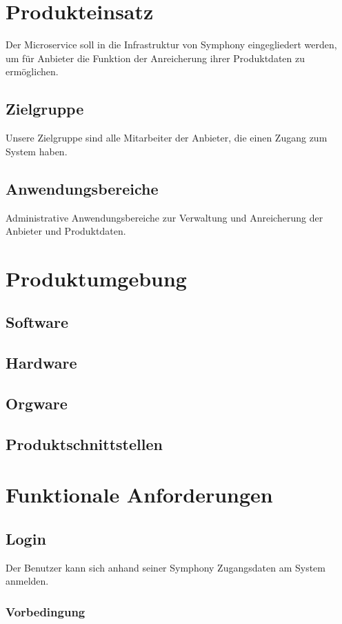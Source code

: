 \documentclass[a4paper,12pt]{article}
\begin{document}
\section{Produkteinsatz}
Der Microservice soll in die Infrastruktur von Symphony eingegliedert werden, um für Anbieter die Funktion der Anreicherung ihrer Produktdaten zu ermöglichen.

\subsection{Zielgruppe}
Unsere Zielgruppe sind alle Mitarbeiter der Anbieter, die einen Zugang zum System haben.

\subsection{Anwendungsbereiche}
Administrative Anwendungsbereiche zur Verwaltung und Anreicherung der Anbieter und Produktdaten.

\section{Produktumgebung}
\subsection{Software}
\subsection{Hardware}
\subsection{Orgware}
\subsection{Produktschnittstellen}



\section{Funktionale Anforderungen}
\subsection{Login}\label{login}
Der Benutzer kann sich anhand seiner Symphony Zugangsdaten am System anmelden.

\subsubsection{Vorbedingung}\label{vorbedingung}
\end{document}
